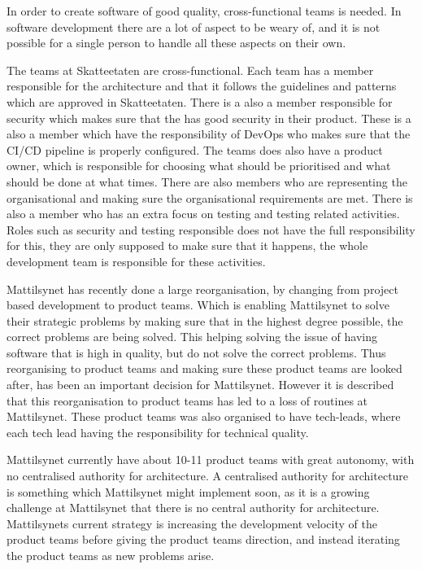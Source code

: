 In order to create software of good quality, cross-functional teams is needed. In software development there are a lot of aspect to be weary of, and it is not possible for a single person to handle all these aspects on their own.

The teams at Skatteetaten are cross-functional. Each team has a member responsible for the architecture and that it follows the guidelines and patterns which are approved in Skatteetaten. There is a also a member responsible for security which makes sure that the has good security in their product. These is a also a member which have the responsibility of DevOps who makes sure that the CI/CD pipeline is properly configured. The teams does also have a product owner, which is responsible for choosing what should be prioritised and what should be done at what times. There are also members who are representing the organisational and making sure the organisational requirements are met. There is also a member who has an extra focus on testing and testing related activities. Roles such as security and testing responsible does not have the full responsibility for this, they are only supposed to make sure that it happens, the whole development team is responsible for these activities. 

Mattilsynet has recently done a large reorganisation, by changing from project based development to product teams. Which is enabling Mattilsynet to solve their strategic problems by making sure that in the highest degree possible, the correct problems are being solved. This helping solving the issue of having software that is high in quality, but do not solve the correct problems. Thus reorganising to product teams and making sure these product teams are looked after, has been an important decision for Mattilsynet. However it is described that this reorganisation to product teams has led to a loss of routines at Mattilsynet. These product teams was also organised to have tech-leads, where each tech lead having the responsibility for technical quality.

Mattilsynet currently have about 10-11 product teams with great autonomy, with no centralised authority for architecture. A centralised authority for architecture is something which Mattilsynet might implement soon, as it is a growing challenge at Mattilsynet that there is no central authority for architecture. Mattilsynets current strategy is increasing the development velocity of the product teams before giving the product teams direction, and instead iterating the product teams as new problems arise.

